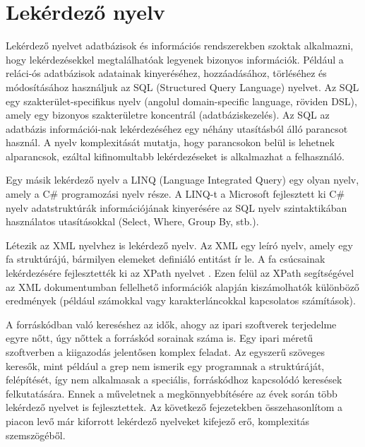 \documentclass[a4paper,12pt]{report}
\begin{document}
\chapter{Lekérdező nyelv}
Lekérdező nyelvet adatbázisok és információs rendszerekben szoktak alkalmazni, hogy lekérdezésekkel megtalálhatóak legyenek bizonyos információk.  Például a reláci-ós adatbázisok adatainak kinyeréséhez, hozzáadásához, törléséhez és módosításához használjuk az SQL (Structured Query Language) nyelvet. Az SQL egy szakterület-specifikus nyelv (angolul domain-specific language, röviden DSL), amely egy bizonyos szakterületre koncentrál (adatbáziskezelés). Az SQL az adatbázis információi-nak lekérdezéséhez egy néhány utasításból álló parancsot használ. A nyelv komplexitását mutatja, hogy parancsokon belül is lehetnek alparancsok, ezáltal kifinomultabb lekérdezéseket is alkalmazhat a felhasználó. 
\par Egy másik lekérdező nyelv a LINQ (Language Integrated Query) egy olyan nyelv, amely a C\# programozási nyelv része. A LINQ-t a Microsoft fejlesztett ki C\# nyelv adatstruktúrák információjának kinyerésére az SQL nyelv szintaktikában használatos utasításokkal (Select, Where, Group By, stb.).
\par Létezik az XML nyelvhez is lekérdező nyelv. Az XML egy leíró nyelv, amely egy fa struktúrájú, bármilyen elemeket definiáló entitást ír le. A fa csúcsainak lekérdezésére fejlesztették ki az XPath nyelvet \cite{xpath}. Ezen felül az XPath segítségével az XML dokumentumban fellelhető információk alapján kiszámolhatók különböző eredmények (például számokkal vagy karakterláncokkal kapcsolatos számítások).
\par A forráskódban való kereséshez az idők, ahogy az ipari szoftverek terjedelme egyre nőtt, úgy nőttek a forráskód sorainak száma is. Egy ipari méretű szoftverben a kiigazodás jelentősen komplex feladat. Az egyszerű szöveges keresők, mint például a grep \cite{grep} nem ismerik egy programnak a struktúráját, felépítését, így nem alkalmasak a speciális, forráskódhoz kapcsolódó keresések felkutatására. Ennek a műveletnek a megkönnyebbítésére az évek során több lekérdező nyelvet is fejlesztettek. Az következő fejezetekben összehasonlítom a piacon levő már kiforrott lekérdező nyelveket kifejező erő, komplexitás szemszögéből.
\end{document}
